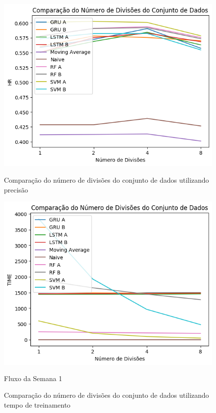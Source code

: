 \begin{figure}[htbp]
    \centering
    \includegraphics[scale=0.8]{monography/img/comparisons/comparacao_do_numero_de_divisoes_do_conjunto_de_dados_hr.png}
    \label{figure:numero_de_divisoes_do_conjunto_de_dados_hr}
    \caption{Comparação do número de divisões do conjunto de dados utilizando precisão}
\end{figure}

\begin{figure}[htbp]
    \centering
    \includegraphics[scale=0.8]{monography/img/comparisons/comparacao_do_numero_de_divisoes_do_conjunto_de_dados_time.png}
    \label{figure:numero_de_divisoes_do_conjunto_de_dados_time}
    \caption{Fluxo da Semana 1}
    \caption{Comparação do número de divisões do conjunto de dados utilizando tempo de treinamento}
\end{figure}

